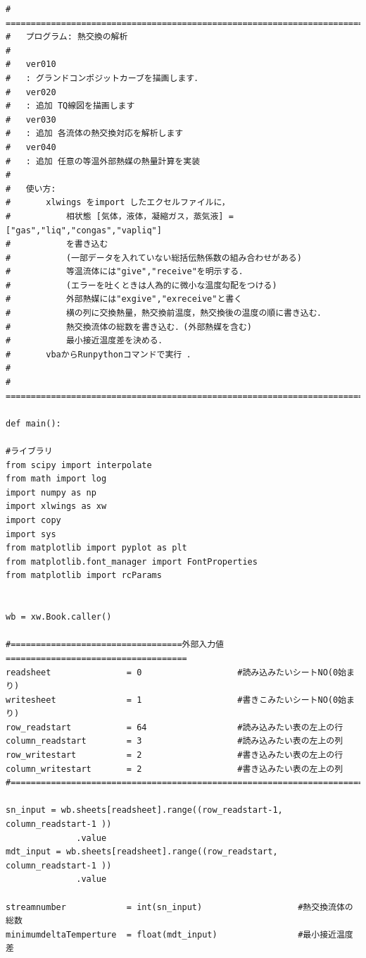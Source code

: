 \documentclass[a4j]{jsreport}
\begin{document}
\begin{lstlisting}[caption=グランドコンポジットカーブおよびTQ線図を書くコード]
#   ===========================================================================
#   プログラム: 熱交換の解析
#
#   ver010
#   : グランドコンポジットカーブを描画します．
#   ver020
#   : 追加 TQ線図を描画します
#   ver030
#   : 追加 各流体の熱交換対応を解析します
#   ver040
#   : 追加 任意の等温外部熱媒の熱量計算を実装
#
#   使い方:
#       xlwings をimport したエクセルファイルに，
#           相状態 [気体，液体，凝縮ガス，蒸気液] = ["gas","liq","congas","vapliq"]
#           を書き込む
#           (一部データを入れていない総括伝熱係数の組み合わせがある)
#           等温流体には"give","receive"を明示する．
#           (エラーを吐くときは人為的に微小な温度勾配をつける)
#           外部熱媒には"exgive","exreceive"と書く
#           横の列に交換熱量，熱交換前温度，熱交換後の温度の順に書き込む．
#           熱交換流体の総数を書き込む．(外部熱媒を含む)
#           最小接近温度差を決める．
#       vbaからRunpythonコマンドで実行 ．
#
#   ===========================================================================

def main():

#ライブラリ
from scipy import interpolate
from math import log
import numpy as np
import xlwings as xw
import copy
import sys
from matplotlib import pyplot as plt
from matplotlib.font_manager import FontProperties
from matplotlib import rcParams


wb = xw.Book.caller()

#==================================外部入力値====================================
readsheet               = 0                   #読み込みたいシートNO(0始まり)
writesheet              = 1                   #書きこみたいシートNO(0始まり)
row_readstart           = 64                  #読み込みたい表の左上の行
column_readstart        = 3                   #読み込みたい表の左上の列
row_writestart          = 2                   #書き込みたい表の左上の行
column_writestart       = 2                   #書き込みたい表の左上の列
#==============================================================================

sn_input = wb.sheets[readsheet].range((row_readstart-1, column_readstart-1 ))
              .value
mdt_input = wb.sheets[readsheet].range((row_readstart, column_readstart-1 ))
              .value

streamnumber            = int(sn_input)                   #熱交換流体の総数
minimumdeltaTemperture  = float(mdt_input)                #最小接近温度差


\end{lstlisting}
\end{document}
